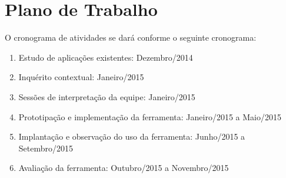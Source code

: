 \chapter{Plano de Trabalho}


O cronograma de atividades se dará conforme o seguinte cronograma:
\begin{enumerate}

\item Estudo de aplicações existentes: Dezembro/2014

\item Inquérito contextual: Janeiro/2015

\item Sessões de interpretação da equipe: Janeiro/2015

\item Prototipação e implementação da ferramenta: Janeiro/2015 a Maio/2015

\item Implantação e observação do uso da ferramenta: Junho/2015 a Setembro/2015

\item Avaliação da ferramenta: Outubro/2015 a Novembro/2015

\end{enumerate}
